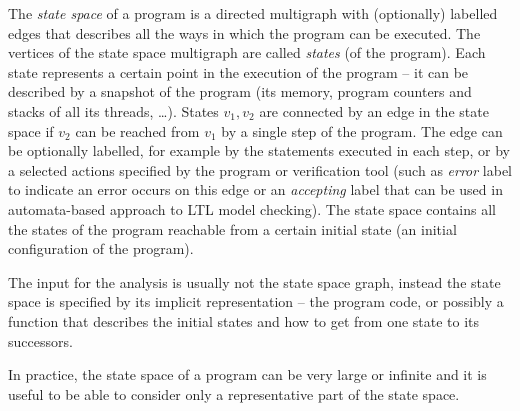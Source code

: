 \begin{definition}
The \emph{state space} of a program is a directed multigraph with (optionally) labelled edges that describes all the ways in which the program can be executed.
The vertices of the state space multigraph are called \emph{states} (of the program).
Each state represents a certain point in the execution of the program -- it can be described by a snapshot of the program (its memory, program counters and stacks of all its threads, …).
States $v_1, v_2$ are connected by an edge in the state space if $v_2$ can be reached from $v_1$ by a single step of the program.
The edge can be optionally labelled, for example by the statements executed in each step, or by a selected actions specified by the program or verification tool (such as \emph{error} label to indicate an error occurs on this edge or an \emph{accepting} label that can be used in automata-based approach to LTL model checking).
The state space contains all the states of the program reachable from a certain initial state (an initial configuration of the program).
\end{definition}

The input for the analysis is usually not the state space graph, instead the
state space is specified by its implicit representation -- the program code, or
possibly a function that describes the initial states and how to get from one
state to its successors.

In practice, the state space of a program can be very large or infinite and it
is useful to be able to consider only a representative part of the state space.

